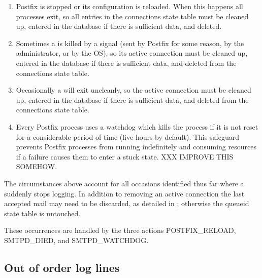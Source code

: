 \begin{enumerate}

    \item Postfix is stopped or its configuration is reloaded.  When this
        happens all  processes exit, so all entries in the
        connections state table must be cleaned up, entered in the database
        if there is sufficient data, and deleted.

    \item Sometimes a  is killed by a signal (sent by Postfix
        for some reason, by the administrator, or by the OS), so its active
        connection must be cleaned up, entered in the database if there is
        sufficient data, and deleted from the connections state table.

    \item Occasionally a  will exit uncleanly, so the active
        connection must be cleaned up, entered in the database if there is
        sufficient data, and deleted from the connections state table.

    \item Every Postfix process uses a watchdog which kills the process if
        it is not reset for a considerable period of time (five hours by
        default).  This safeguard prevents Postfix processes from running
        indefinitely and consuming resources if a failure causes them to
        enter a stuck state.  XXX IMPROVE THIS SOMEHOW\@.

\end{enumerate}

The circumstances above account for all occasions identified thus far where
a  suddenly stops logging.  In addition to removing an active
connection the last accepted mail may need to be discarded, as detailed in
; otherwise the queueid state table
is untouched.

These occurrences are handled by the three actions POSTFIX\_RELOAD,
SMTPD\_DIED, and SMTPD\_WATCHDOG\@.

\subsection{Out of order log lines}

\label{out of order log lines}

